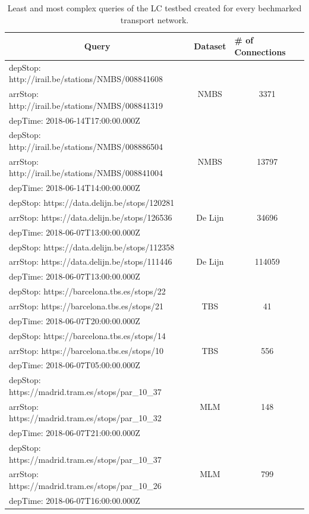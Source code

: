\documentclass[sw]{iosart2x}
\begin{document}
	\begin{table}
	\centering
	\label{tab:queries}
	\begin{tabular}{l|c|c}
	\hline
	\multicolumn{1}{c|}{\textbf{Query}} & \multicolumn{1}{l|}{\textbf{Dataset}} & \multicolumn{1}{l}{\textbf{\# of Connections}} \\ \hline
		\tiny depStop: http://irail.be/stations/NMBS/008841608 & \multirow{3}{*}{NMBS} & \multirow{3}{*}{3371} \\
		\tiny arrStop: http://irail.be/stations/NMBS/008841319 & & \\
		\tiny depTime: 2018-06-14T17:00:00.000Z & & \\ \hline
		\tiny depStop: http://irail.be/stations/NMBS/008886504 & \multirow{3}{*}{NMBS} & \multirow{3}{*}{13797} \\
		\tiny arrStop: http://irail.be/stations/NMBS/008841004 & & \\
		\tiny depTime: 2018-06-14T14:00:00.000Z & & \\ \hline     
		\tiny depStop: https://data.delijn.be/stops/120281 & \multirow{3}{*}{De Lijn} & \multirow{3}{*}{34696} \\
		\tiny arrStop: https://data.delijn.be/stops/126536 & & \\
		\tiny depTime: 2018-06-07T13:00:00.000Z & & \\ \hline
		\tiny depStop: https://data.delijn.be/stops/112358 & \multirow{3}{*}{De Lijn} & \multirow{3}{*}{114059} \\
		\tiny arrStop: https://data.delijn.be/stops/111446 & & \\
		\tiny depTime: 2018-06-07T13:00:00.000Z & & \\ \hline
		\tiny depStop: https://barcelona.tbs.es/stops/22 & \multirow{3}{*}{TBS} & \multirow{3}{*}{41} \\
		\tiny arrStop: https://barcelona.tbs.es/stops/21 & & \\
		\tiny depTime: 2018-06-07T20:00:00.000Z & & \\ \hline
		\tiny depStop: https://barcelona.tbs.es/stops/14 & \multirow{3}{*}{TBS} & \multirow{3}{*}{556} \\
		\tiny arrStop: https://barcelona.tbs.es/stops/10 & & \\
		\tiny depTime: 2018-06-07T05:00:00.000Z & & \\ \hline
		\tiny depStop: https://madrid.tram.es/stops/par\_10\_37 & \multirow{3}{*}{MLM} & \multirow{3}{*}{148} \\
		\tiny arrStop: https://madrid.tram.es/stops/par\_10\_32 & & \\
		\tiny depTime: 2018-06-07T21:00:00.000Z & & \\ \hline
		\tiny depStop: https://madrid.tram.es/stops/par\_10\_37 & \multirow{3}{*}{MLM} & \multirow{3}{*}{799} \\
		\tiny arrStop: https://madrid.tram.es/stops/par\_10\_26 & & \\
		\tiny depTime: 2018-06-07T16:00:00.000Z & & \\ \hline
	\end{tabular}
	\caption{Least and most complex queries of the LC testbed created for every bechmarked transport network.} 
	\end{table}
	
\end{document}
